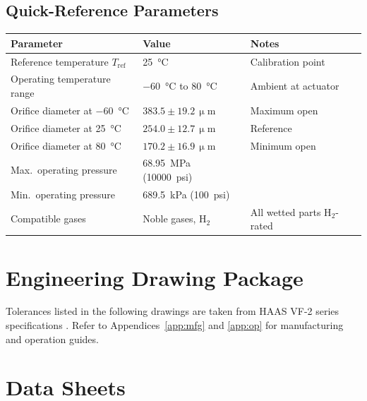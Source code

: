 \documentclass[12pt, letterpaper]{report}%
\begin{document}
\begin{appendices}
	\section{Quick-Reference Parameters}

	\begin{center}
	\begin{tabular}{lll}
	\toprule
	\textbf{Parameter} & \textbf{Value} & \textbf{Notes} \\
	\midrule
	Reference temperature $T_\mathrm{ref}$ & \SI{25}{\degreeCelsius} & Calibration point \\
	Operating temperature range & \SI{-60}{\degreeCelsius} to \SI{+80}{\degreeCelsius} & Ambient at actuator \\
	Orifice diameter at \SI{-60}{\degreeCelsius} & $383.5 \pm 19.2\,\upmu$m & Maximum open \\
	Orifice diameter at \SI{+25}{\degreeCelsius} & $254.0 \pm 12.7\,\upmu$m & Reference \\
	Orifice diameter at \SI{+80}{\degreeCelsius} & $170.2 \pm 16.9\,\upmu$m & Minimum open \\
	Max.\ operating pressure & \SI{68.95}{\mega\pascal} (\num{10000}~psi) & \\
	Min.\ operating pressure & \SI{689.5}{\kilo\pascal} (\num{100}~psi) & \\
	Compatible gases & Noble gases, H$_2$ & All wetted parts H$_2$-rated \\
	\bottomrule
	\end{tabular}
	\end{center}

	\renewcommand{\thesection}{\thechapter.\arabic{section}}

\chapter{Engineering Drawing Package}
\label{app:drawings}

	Tolerances listed in the following drawings are taken from HAAS VF-2 series specifications \cite{ref_haas}.
	Refer to Appendices~\ref{app:mfg} and \ref{app:op} for manufacturing and operation guides.

	

\chapter{Data Sheets}
\label{app:datasheets}


\end{appendices}
\end{document}
